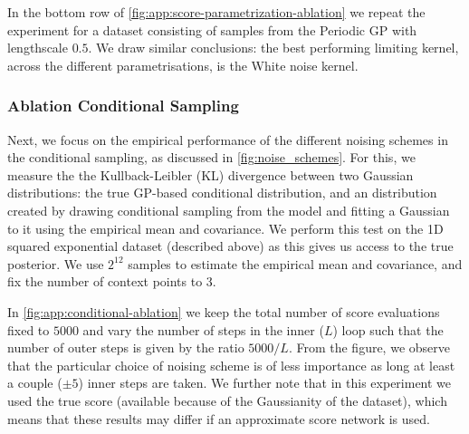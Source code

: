 In the bottom row of \cref{fig:app:score-parametrization-ablation} we repeat the experiment for a dataset consisting of samples from the Periodic GP with lengthscale $0.5$.
We draw similar conclusions: the best performing limiting kernel, across the different parametrisations, is the White noise kernel.

\subsubsection{Ablation Conditional Sampling}
\label{sec:ablation_cond_smapling_noise}
Next, we focus on the empirical performance of the different noising schemes in the conditional sampling, as discussed in \cref{fig:noise_schemes}.
For this, we measure the the Kullback-Leibler (KL) divergence between two Gaussian distributions: the true GP-based conditional distribution, and an distribution created by drawing conditional sampling from the model and fitting a Gaussian to it using the empirical mean and covariance.
We perform this test on the 1D squared exponential dataset (described above) as this gives us access to the true posterior.
We use $2^{12}$ samples to estimate the empirical mean and covariance, and fix the number of context points to 3.

In \cref{fig:app:conditional-ablation} we keep the total number of score evaluations fixed to $5000$ and vary the number of steps in the inner ($L$) loop such that the number of outer steps is given by the ratio $5000/L$.
From the figure, we observe that the particular choice of noising scheme is of less importance as long at least a couple ($\pm 5$) inner steps are taken.
We further note that in this experiment we used the true score (available because of the Gaussianity of the dataset), which means that these results may differ if an approximate score network is used.

